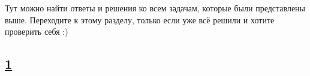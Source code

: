 Тут можно найти ответы и решения ко всем задачам, которые были представлены выше. Переходите к этому разделу, только если уже всё решили и хотите проверить себя :)

\subsection*{\hyperref[sec:problem1]{1}}
\label{sec:sol_problem1}
